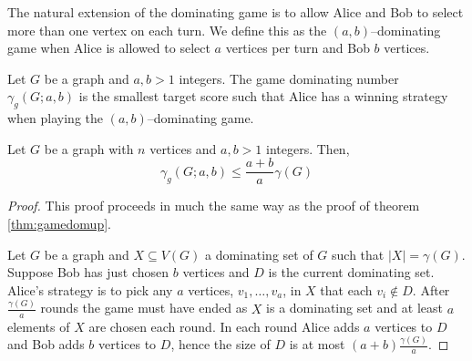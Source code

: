 The natural extension of the dominating game is to allow Alice and Bob to select more than one vertex on each turn. We define this as the $(a,b)$--dominating game when Alice is allowed to select $a$ vertices per turn and Bob $b$ vertices.

\begin{definition}
    Let $G$ be a graph and $a,b>1$ integers. The game dominating number $\gamma_g(G;a,b)$ is the smallest target score such that Alice has a winning strategy when playing the $(a,b)$--dominating game.
\end{definition}

\begin{theorem} %
    Let $G$ be a graph with $n$ vertices and $a,b>1$ integers. Then,
    \[\gamma_{g}(G;a,b) \leq \frac{a+b}{a}\gamma(G)\]
\end{theorem}
\begin{proof}
    This proof proceeds in much the same way as the proof of theorem \ref{thm:gamedomup}.
    
   Let $G$ be a graph and $X\subseteq V(G)$ a dominating set of $G$ such that $|X| = \gamma(G)$. Suppose Bob has just chosen $b$ vertices and $D$ is the current dominating set. Alice's strategy is to pick any $a$ vertices, $v_1,\dots,v_a$, in $X$ that each $v_i\notin D$. After $\frac{\gamma(G)}{a}$ rounds the game must have ended as $X$ is a dominating set and at least $a$ elements of $X$ are chosen each round. In each round Alice adds $a$ vertices to $D$ and Bob adds $b$ vertices to $D$, hence the size of $D$ is at most $(a+b)\frac{\gamma(G)}{a}$.
\end{proof}













